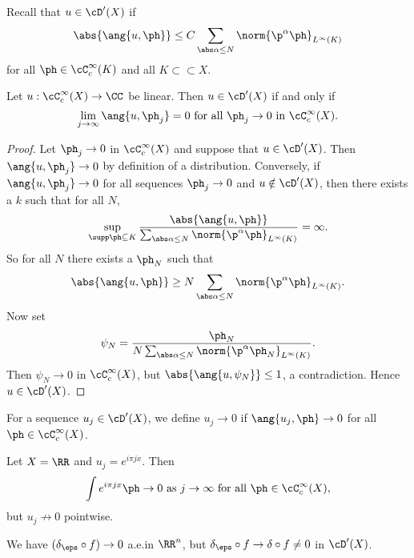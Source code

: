 Recall that $u\in\cD'(X)$ if
\[ \abs{\ang{u,\ph}} \leq C \sum_{\abs\alpha\leq N} \norm{\p^\alpha\ph}_{L^\infty(K)} \]
for all $\ph\in\cC_c^\infty(K)$ and all $K \subset\subset X$.

\begin{thm}
  Let $u: \cC_c^\infty(X) \to \CC$ be linear.
  Then $u\in\cD'(X)$ if and only if
  \[ \lim_{j\to\infty}\ang{u,\ph_j}=0 \text{ for all } \ph_j\to0 \text{ in } \cC_c^\infty(X). \]
\end{thm}

\begin{proof}
  Let $\ph_j\to0$ in $\cC_c^\infty(X)$ and suppose that $u\in\cD'(X)$.
  Then $\ang{u,\ph_j}\to0$ by definition of a distribution.
  Conversely, if $\ang{u,\ph_j}\to0$ for all sequences $\ph_j\to0$ and $u\notin\cD'(X)$, then there exists a $k$ such that for all $N$,
  \[ \sup_{\supp\ph\subseteq K} \frac{\abs{\ang{u,\ph}}}{\sum_{\abs\alpha\leq N} \norm{\p^\alpha\ph}_{L^\infty(K)}} = \infty. \]
  So for all $N$ there exists a $\ph_N$ such that
  \[ \abs{\ang{u,\ph}} \geq N \sum_{\abs\alpha\leq N} \norm{\p^\alpha\ph}_{L^\infty(K)}. \]
  Now set
  \[ \psi_N = \frac{\ph_N}{N\sum_{\abs\alpha\leq N} \norm{\p^\alpha\ph_N}_{L^\infty(K)}}. \]
  Then $\psi_N\to0$ in $\cC_c^\infty(X)$, but $\abs{\ang{u,\psi_N}}\leq1$, a contradiction.
  Hence $u\in\cD'(X)$.
\end{proof}

\begin{defn}
  For a sequence $u_j\in\cD'(X)$, we define $u_j\to0$ if $\ang{u_j,\ph}\to0$ for all $\ph\in\cC_c^\infty(X)$.  
\end{defn}

\begin{exam}
  \lv
  \begin{enum}
    \io Let $X=\RR$ and $u_j=e^{i\pi jx}$.
      Then
      \[ \int e^{i\pi jx}\ph \to 0 \text{ as } j\to\infty \text{ for all } \ph\in\cC_c^\infty(X), \]
      but $u_j\not\to0$ pointwise.

      \io We have $(\delta_\eps\circ f)\to0$ a.e.\@ in $\RR^n$, but $\delta_\eps\circ f\to\delta\circ f\neq0$ in $\cD'(X)$.
  \end{enum}
\end{exam}
